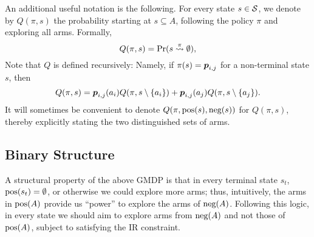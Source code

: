 An additional useful notation is the following. For every state $s\in \mathcal{S}$, we denote by $Q(\pi,s)$ the probability starting at $s\subseteq A$, following the policy $\pi$ and exploring all arms. Formally,
\[
Q(\pi,s)= \Pr(s\stackrel{\pi}{\rightsquigarrow}\emptyset),
\]
Note that $Q$ is defined recursively: Namely, if $\pi(s)=\boldsymbol{ p }_{i,j}$ for a non-terminal state $s$, then
\[
Q(\pi,s)=\boldsymbol{ p }_{i,j}(a_i)Q(\pi,s\setminus\{a_i\})+\boldsymbol{ p }_{i,j}(a_j)Q(\pi,s\setminus\{a_j\}).
\]
It will sometimes be convenient to denote $Q(\pi,\textnormal{pos}(s),\textnormal{neg}(s))$ for $Q(\pi,s)$, thereby explicitly stating the two distinguished sets of arms. 


\subsection{Binary Structure}\label{subsec:bin}
A structural property of the above GMDP is that in every terminal state $s_t$, $\textnormal{pos}(s_t)=\emptyset$, or otherwise we could explore more arms; thus, intuitively, the arms in $\textnormal{pos}(A)$ provide us ``power'' to explore the arms of $\textnormal{neg}(A)$. Following this logic, in every state we should aim to explore arms from $\textnormal{neg}(A)$ and not those of $\textnormal{pos}(A)$, subject to satisfying the IR constraint.

